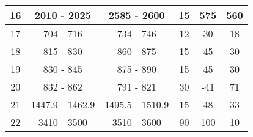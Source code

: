 \begin{table}[]
\begin{tabular}{|c|c|c|c|c|c|}
16                                                          & 2010 - 2025                                            & 2585 - 2600                                              & 15                                                                   & 575                                                              & 560                                                         \\ \hline
17                                                          & 704 - 716                                              & 734 - 746                                                & 12                                                                   & 30                                                               & 18                                                          \\ \hline
18                                                          & 815 - 830                                              & 860 - 875                                                & 15                                                                   & 45                                                               & 30                                                          \\ \hline
19                                                          & 830 - 845                                              & 875 - 890                                                & 15                                                                   & 45                                                               & 30                                                          \\ \hline
20                                                          & 832 - 862                                              & 791 - 821                                                & 30                                                                   & -41                                                              & 71                                                          \\ \hline
21                                                          & 1447.9 - 1462.9                                        & 1495.5 - 1510.9                                          & 15                                                                   & 48                                                               & 33                                                          \\ \hline
22                                                          & 3410 - 3500                                            & 3510 - 3600                                              & 90                                                                   & 100                                                              & 10                                                          \\ \hline

\end{tabular}
\end{table}
